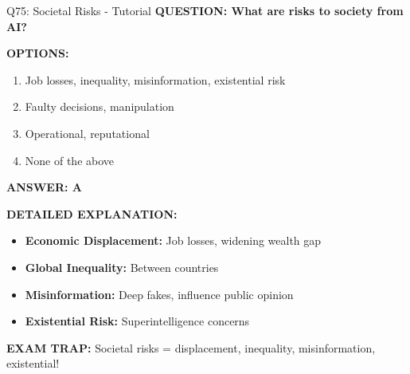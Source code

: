 \documentclass[8pt]{beamer}
\begin{document}
	\begin{frame}{Q75: Societal Risks - Tutorial}
		\fontsize{6.5}{7.5}\selectfont
		\textbf{QUESTION: What are risks to society from AI?}
		
		\vspace{0.1cm}
		\textbf{OPTIONS:}
		\begin{enumerate}
			\item Job losses, inequality, misinformation, existential risk
			\item Faulty decisions, manipulation
			\item Operational, reputational
			\item None of the above
		\end{enumerate}
		
		\vspace{0.1cm}
		\textcolor{myblue}{\textbf{ANSWER: A}}
		
		\vspace{0.1cm}
		\textbf{DETAILED EXPLANATION:}
		\begin{itemize}
			\item \textbf{Economic Displacement:} Job losses, widening wealth gap
			\item \textbf{Global Inequality:} Between countries
			\item \textbf{Misinformation:} Deep fakes, influence public opinion
			\item \textbf{Existential Risk:} Superintelligence concerns
		\end{itemize}
		
		\vspace{0.1cm}
		\textcolor{myred}{\textbf{EXAM TRAP:}} Societal risks = \textcolor{myblue}{displacement, inequality, misinformation, existential}!
	\end{frame}
	
	
\end{document}
